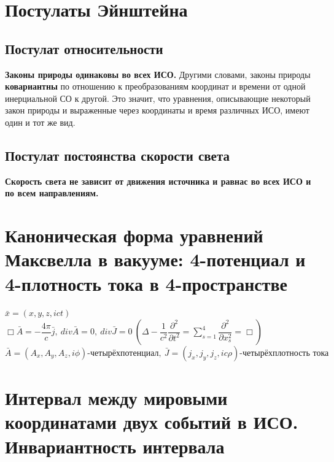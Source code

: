 \newcommand{\colontitulAutors}{edombek, astronom\_v\_cube}
\newcommand{\colontitulYear}{2022}
\newcommand{\colontitulEducationalSubject}{Специальная теория относительности}
\newcommand{\colontitulTeacher}{И.~А.~Павличенко}





	\small
	\begin{multicols*}{2}
		\section{Постулаты Эйнштейна}
		
		\subsection{Постулат относительности}
		
		\textbf{Законы природы одинаковы во всех ИСО.} Другими словами, законы природы \textbf{ковариантны} по отношению к преобразованиям координат и времени от одной инерциальной СО к другой. Это значит, что уравнения, описывающие некоторый закон природы и выраженные через координаты и время различных ИСО, имеют один и тот же вид.
		
		\subsection{Постулат постоянства скорости света}
		
		\textbf{Скорость света не зависит от движения источника и равнас во всех ИСО и по всем направлениям.}
		
		\section{Каноническая форма уравнений Максвелла в вакууме: 4-потенциал и 4-плотность тока в 4-пространстве}
		
		$ \bar{x} = \left(x, y, z, ict\right) $ \\
		$ \Box \bar{A} = -\dfrac{4\pi}{c}\bar{j},~ div{\bar{A}} = 0,~ div{\bar{J}} = 0~ \left(\Delta -\dfrac{1}{c^2}\dfrac{\partial^2}{\partial t^2}=\sum\limits_{s=1}^4\dfrac{\partial^2}{\partial x_s^2}=\Box\right) $  \\
		$ \bar{A} = \left(A_x, A_y, A_z, i\phi\right) \text{-четырёхпотенциал},~ \bar{J} = \left(j_x, j_y, j_z, ic\rho\right) \text{-четырёхплотность тока} $
		
		\section{Интервал между мировыми координатами двух событий в ИСО. Инвариантность интервала}
		

\end{multicols*}
